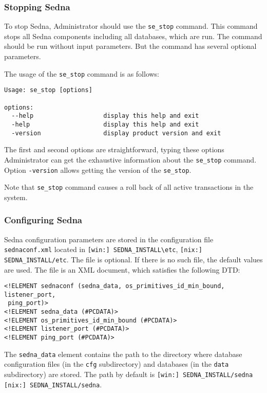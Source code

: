 \documentclass[a4paper,12pt]{article}
\begin{document}
\subsubsection{Stopping Sedna}

To stop Sedna, Administrator should use the \verb!se_stop! command. This command stops all Sedna components including all databases, which are run. The command should be run without input parameters. But the command has several optional parameters.

The usage of the \verb!se_stop! command is as follows:

\begin{verbatim}
Usage: se_stop [options]

options:
  --help                   display this help and exit
  -help                    display this help and exit
  -version                 display product version and exit
\end{verbatim}
The first and second options are straightforward, typing these options Administrator can get the exhaustive information about the \verb!se_stop! command. Option \verb!-version! allows getting the version of the \verb!se_stop!.

Note that \verb!se_stop! command causes a roll back of all active transactions in the system.

\subsubsection{Configuring Sedna}
\label{sec:ConfigSedna}
Sedna configuration parameters are stored in the configuration file \verb!sednaconf.xml! located in
\verb![win:] SEDNA_INSTALL\etc!, \verb![nix:] SEDNA_INSTALL/etc!. The file is optional. If there is no such file, the default values are used.
The file is an XML document, which satisfies the following DTD:

\begin{verbatim}
<!ELEMENT sednaconf (sedna_data, os_primitives_id_min_bound, listener_port,
 ping_port)>
<!ELEMENT sedna_data (#PCDATA)>
<!ELEMENT os_primitives_id_min_bound (#PCDATA)>
<!ELEMENT listener_port (#PCDATA)>
<!ELEMENT ping_port (#PCDATA)>
\end{verbatim}

The \verb!sedna_data! element contains the path to the directory where 
database configuration files (in the \verb!cfg! subdirectory) and 
databases (in the \verb!data! subdirectory) are stored. The path by default is
\verb![win:] SEDNA_INSTALL/sedna! \verb![nix:] SEDNA_INSTALL/sedna!.
\end{document}

